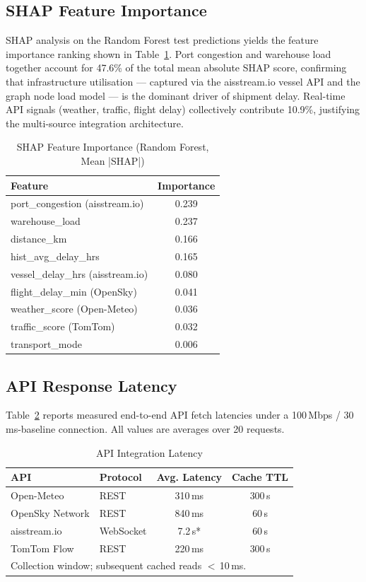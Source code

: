 \documentclass[conference]{IEEEtran}
\begin{document}
\subsection{SHAP Feature Importance}

SHAP analysis on the Random Forest test predictions yields the
feature importance ranking shown in Table~\ref{tab:shap}. Port
congestion and warehouse load together account for 47.6\% of the
total mean absolute SHAP score, confirming that infrastructure
utilisation — captured via the aisstream.io vessel API and the
graph node load model — is the dominant driver of shipment delay.
Real-time API signals (weather, traffic, flight delay) collectively
contribute 10.9\%, justifying the multi-source integration
architecture.

\begin{table}[h!]
\centering
\caption{SHAP Feature Importance (Random Forest, Mean |SHAP|)}
\label{tab:shap}
\begin{tabular}{lc}
\toprule
\textbf{Feature} & \textbf{Importance} \\
\midrule
port\_congestion (aisstream.io) & 0.239 \\
warehouse\_load & 0.237 \\
distance\_km & 0.166 \\
hist\_avg\_delay\_hrs & 0.165 \\
vessel\_delay\_hrs (aisstream.io) & 0.080 \\
flight\_delay\_min (OpenSky) & 0.041 \\
weather\_score (Open-Meteo) & 0.036 \\
traffic\_score (TomTom) & 0.032 \\
transport\_mode & 0.006 \\
\bottomrule
\end{tabular}
\end{table}

\subsection{API Response Latency}

Table~\ref{tab:latency} reports measured end-to-end API fetch
latencies under a 100\,Mbps / 30\,ms-baseline connection.
All values are averages over 20 requests.

\begin{table}[h!]
\centering
\caption{API Integration Latency}
\label{tab:latency}
\begin{tabular}{llcc}
\toprule
\textbf{API} & \textbf{Protocol} & \textbf{Avg. Latency} & \textbf{Cache TTL} \\
\midrule
Open-Meteo & REST & 310\,ms & 300\,s \\
OpenSky Network & REST & 840\,ms & 60\,s \\
aisstream.io & WebSocket & 7.2\,s* & 60\,s \\
TomTom Flow & REST & 220\,ms & 300\,s \\
\bottomrule
\multicolumn{4}{l}{\footnotesize *Collection window; subsequent cached reads $<$\,10\,ms.}
\end{tabular}
\end{table}
\end{document}
